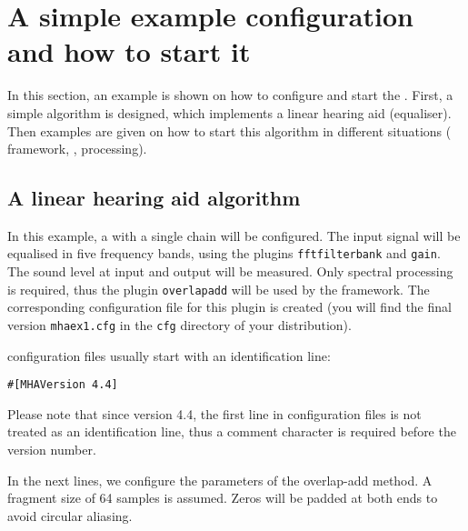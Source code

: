 \section{A simple example configuration and how to start it}%
\label{sec:scenarios}%
%
%
%

In this section, an example is shown on how to configure and start the
\mha{}. First, a simple algorithm is designed, which implements a 
linear hearing aid (equaliser). Then examples are given on
how to start this algorithm in different situations (\Windows{}
framework, \mhad{}, \Matlab{} processing).

\subsection{A linear hearing aid algorithm}%
\label{sec:linha}%

In this example, a \mha{} with a single chain will be configured. The
input signal will be equalised in five frequency bands, using the \mha{}
plugins \verb!fftfilterbank! and
\verb!gain!. The sound level at input and
output will be measured. Only spectral processing is required, thus
the plugin \verb!overlapadd! will be
used by the framework. The corresponding configuration file for this
plugin is created (you will find the final version \verb!mhaex1.cfg!
in the \verb!cfg!  directory of your \mha{} distribution).

\mha{} configuration files usually start with an identification line:
\begin{verbatim}
#[MHAVersion 4.4]
\end{verbatim}
Please note that since version 4.4, the first line in configuration
files is not treated as an identification line, thus a comment
character is required before the version number.

In the next lines, we configure the parameters of the overlap-add
method. A fragment size of 64 samples is assumed. Zeros will be padded
at both ends to avoid circular aliasing.

